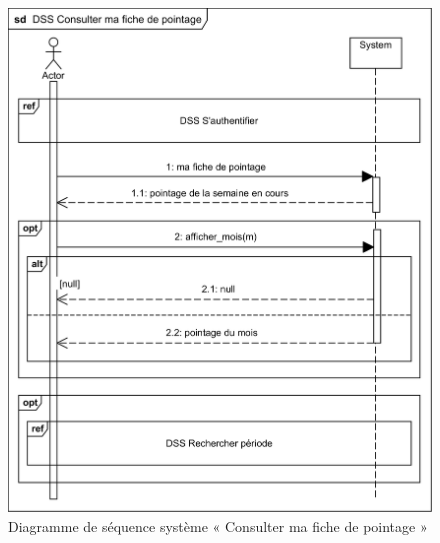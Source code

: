         \begin{figure}[h!]
             \centering
             \includegraphics[scale=1.1]{images/DSS/DSS Consulter ma fiche de pointage.png}
             \caption{Diagramme de séquence système « Consulter ma  fiche de pointage »}
             \label{fig4}
        \end{figure}
    
    \vspace{-30pt}
